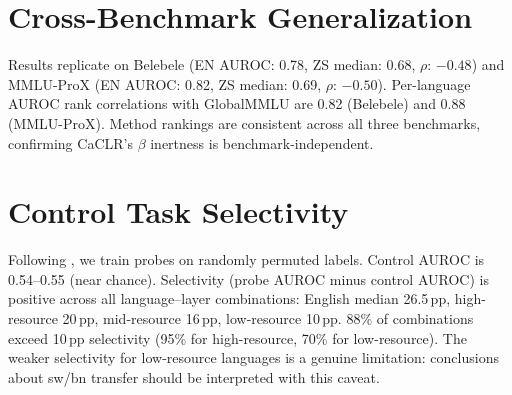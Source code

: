\documentclass[11pt,a4paper]{article}
\begin{document}
\section{Cross-Benchmark Generalization}
\label{app:benchmarks}

Results replicate on Belebele (EN AUROC: 0.78, ZS median: 0.68, $\rho$: $-0.48$) and MMLU-ProX (EN AUROC: 0.82, ZS median: 0.69, $\rho$: $-0.50$). Per-language AUROC rank correlations with GlobalMMLU are 0.82 (Belebele) and 0.88 (MMLU-ProX). Method rankings are consistent across all three benchmarks, confirming CaCLR's $\beta$ inertness is benchmark-independent.

\section{Control Task Selectivity}
\label{app:control}

Following \citet{hewitt2019control}, we train probes on randomly permuted labels. Control AUROC is 0.54--0.55 (near chance). Selectivity (probe AUROC minus control AUROC) is positive across all language--layer combinations: English median 26.5\,pp, high-resource 20\,pp, mid-resource 16\,pp, low-resource 10\,pp. 88\% of combinations exceed 10\,pp selectivity (95\% for high-resource, 70\% for low-resource). The weaker selectivity for low-resource languages is a genuine limitation: conclusions about sw/bn transfer should be interpreted with this caveat.
\end{document}
